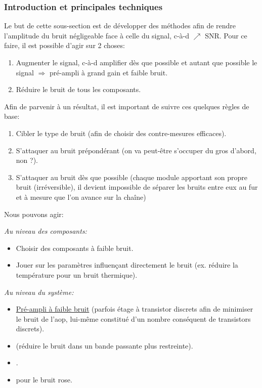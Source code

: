 \subsubsection{Introduction et principales techniques}
Le but de cette sous-section est de développer des méthodes afin de rendre l'amplitude du bruit négligeable face à celle du signal, c-à-d \(\nearrow\) SNR. Pour ce faire, il est possible d'agir sur 2 choses:
\begin{enumerate}
	\item Augmenter le signal, c-à-d amplifier dès que possible et autant que possible le signal \(\Rightarrow\) pré-ampli à grand gain et faible bruit.
	\item Réduire le bruit de tous les composants.
\end{enumerate}
Afin de parvenir à un résultat, il est important de suivre ces quelques règles de base:
\begin{enumerate}
	\item Cibler le type de bruit (afin de choisir des contre-mesures efficaces).
	\item S'attaquer au bruit prépondérant (on va peut-être s'occuper du gros d'abord, non ?).
	\item S'attaquer au bruit dès que possible (chaque module apportant son propre bruit (irréversible), il devient impossible de séparer les bruits entre eux au fur et à mesure que l'on avance sur la chaîne)
\end{enumerate}
Nous pouvons agir:
\begin{description}
\item \emph{Au niveau des composants:}
\begin{itemize}
	\item Choisir des composants à faible bruit.
	\item Jouer sur les paramètres influençant directement le bruit (ex. réduire la température pour un bruit thermique).
\end{itemize}
\item \emph{Au niveau du système:}
\begin{itemize}
	\item \hyperref[subsubsec:entreenobruit]{Pré-ampli à faible bruit} (parfois étage à transistor discrets afin de minimiser le bruit de l'aop, lui-même constitué d'un nombre conséquent de transistors discrets).
	\item {} (réduire le bruit dans un bande passante plus restreinte).
	\item {}.
	\item {} pour le bruit rose.
\end{itemize}
\end{description}
